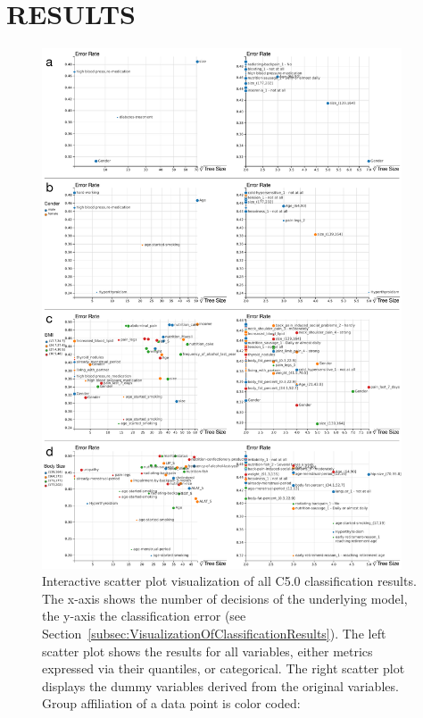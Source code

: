 \documentclass[a4paper,twoside]{style/article}
\begin{document}
\section{\uppercase{Results}}
\begin{figure}[p!]
  \centering
  \includegraphics[width=0.95\textwidth]{figures/results}
  \caption{
Interactive scatter plot visualization of all C5.0 classification results.
The x-axis shows the number of decisions of the underlying model, the y-axis the classification error (see Section~\ref{subsec:VisualizationOfClassificationResults}).
The left scatter plot shows the results for all variables, either metrics expressed via their quantiles, or categorical.
The right scatter plot displays the dummy variables derived from the original variables.
Group affiliation of a data point is color coded:
}
\end{figure}
\end{document}
